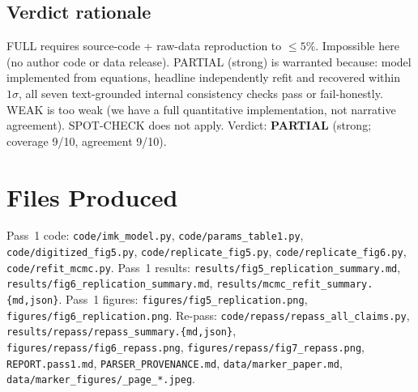 \documentclass[11pt]{article}
\begin{document}
\subsection{Verdict rationale}

FULL requires source-code + raw-data reproduction to $\leq 5\%$. Impossible here (no author code
or data release). PARTIAL (strong) is warranted because: model implemented from equations,
headline independently refit and recovered within $1\sigma$, all seven text-grounded internal
consistency checks pass or fail-honestly. WEAK is too weak (we have a full quantitative
implementation, not narrative agreement). SPOT-CHECK does not apply. Verdict:
\textbf{PARTIAL} (strong; coverage 9/10, agreement 9/10).

\section{Files Produced}

Pass~1 code: \texttt{code/imk\_model.py}, \texttt{code/params\_table1.py},
\texttt{code/digitized\_fig5.py}, \texttt{code/replicate\_fig5.py},
\texttt{code/replicate\_fig6.py}, \texttt{code/refit\_mcmc.py}.
Pass~1 results: \texttt{results/fig5\_replication\_summary.md},
\texttt{results/fig6\_replication\_summary.md},
\texttt{results/mcmc\_refit\_summary.\{md,json\}}.
Pass~1 figures: \texttt{figures/fig5\_replication.png},
\texttt{figures/fig6\_replication.png}.
Re-pass: \texttt{code/repass/repass\_all\_claims.py},
\texttt{results/repass/repass\_summary.\{md,json\}},
\texttt{figures/repass/fig6\_repass.png}, \texttt{figures/repass/fig7\_repass.png},
\texttt{REPORT.pass1.md}, \texttt{PARSER\_PROVENANCE.md},
\texttt{data/marker\_paper.md}, \texttt{data/marker\_figures/\_page\_*.jpeg}.


\end{document}
